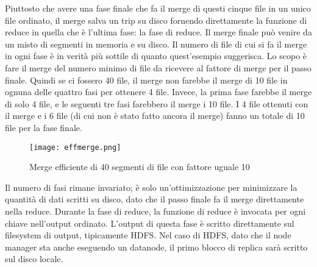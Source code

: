 Piuttosto che avere una fase finale che fa il merge di questi cinque file in un unico file ordinato, il merge salva un trip su disco fornendo direttamente la funzione di reduce in quella che è l'ultima fase: la fase di reduce. Il merge finale può venire da un misto di segmenti in memoria e su disco. Il numero di file di cui si fa il merge in ogni fase è in verità più sottile di quanto quest'esempio suggerisca. Lo scopo è fare il merge del numero minimo di file da ricevere al fattore di merge per il passo finale. Quindi se ci fossero 40 file, il merge non farebbe il merge di 10 file in ognuna delle quattro fasi per ottenere 4 file. Invece, la prima fase farebbe il merge di solo 4 file, e le seguenti tre fasi farebbero il merge i 10 file. I 4 file ottenuti con il merge e i 6 file (di cui non è stato fatto ancora il merge) fanno un totale di 10 file per la fase finale.
\begin{figure}[H]
  \begin{center}
    \texttt{[image: effmerge.png]}
    \caption{Merge efficiente di 40 segmenti di file con fattore uguale 10}
    \label{fg:effmerge.png}
  \end{center}
\end{figure}
Il numero di fasi rimane invariato; è solo un'ottimizzazione per minimizzare la quantità di dati scritti su disco, dato che il passo finale fa il merge direttamente nella reduce.
Durante la fase di reduce, la funzione di reduce è invocata per ogni chiave nell'output ordinato. L'output di questa fase è scritto direttamente sul filesystem di output, tipicamente HDFS. Nel caso di HDFS, dato che il node manager sta anche eseguendo un datanode, il primo blocco di replica sarà scritto sul disco locale.
\newpage

